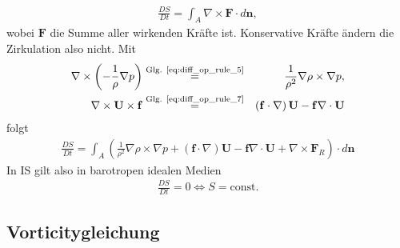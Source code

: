 \documentclass{book}
\newcommand{\md}[1]{\frac{D#1}{Dt}}
\begin{document}
%
\begin{eqnarray}
\md{S} = \int_A\nabla\times\mathbf{F}\cdot d\mathbf{n},
\end{eqnarray}
%
wobei $\mathbf{F}$ die Summe aller wirkenden Kräfte ist. Konservative Kräfte ändern die Zirkulation also nicht. Mit
%
\begin{eqnarray}
\nabla\times\left(-\frac{1}{\rho}\nabla p\right) & \stackrel{\text{Glg. \eqref{eq:diff_op_rule_5}}}{=} & \frac{1}{\rho^2}\nabla\rho\times\nabla p,\\
\nabla\times\mathbf{U}\times\mathbf{f} & \stackrel{\text{Glg. \eqref{eq:diff_op_rule_7}}}{=} & \left(\mathbf{f}\cdot\nabla\right)\mathbf{U} - \mathbf{f}\nabla\cdot\mathbf{U}
\end{eqnarray}
%
folgt
%
\begin{eqnarray}
\md{S} = \int_A\left(\frac{1}{\rho^2}\nabla\rho\times\nabla p + \left(\mathbf{f}\cdot\nabla\right)\mathbf{U} - \mathbf{f}\nabla\cdot\mathbf{U} + \nabla\times\mathbf{F}_R\right)\cdot d\mathbf{n}\label{eq:circ_theorem}
\end{eqnarray}
%
In IS gilt also in barotropen idealen Medien
%
\begin{eqnarray}
\md{S} = 0 \Leftrightarrow S = \text{const.}\label{eq:circ_theorem_mod_1}
\end{eqnarray}

\subsection{Vorticitygleichung}
\label{sec:vorticitygleichung}
\end{document}

